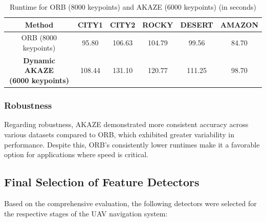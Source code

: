 \begin{table}[H]
    \centering
    \caption{Runtime for ORB (8000 keypoints) and AKAZE (6000 keypoints) (in seconds)}
    \label{tab:runtime_comparison_rot}
    \begin{tabular}{|c|c|c|c|c|c|}
    \hline
    \textbf{Method} & \textbf{CITY1} & \textbf{CITY2} & \textbf{ROCKY} & \textbf{DESERT} & \textbf{AMAZON} \\ \hline
    ORB (8000 keypoints) & 95.80 & 106.63 & 104.79 & 99.56 & 84.70 \\ \hline
    \makecell{\textbf{Dynamic AKAZE} \\ \textbf{(6000 keypoints)}} & 108.44 & 131.10 & 120.77 & 111.25 & 98.70 \\ \hline
    \end{tabular}
\end{table}

\subsubsection*{Robustness}

Regarding robustness, AKAZE demonstrated more consistent accuracy across various datasets compared to ORB, which exhibited greater variability in performance. Despite this, ORB's consistently lower runtimes make it a favorable option for applications where speed is critical.

\subsection{Final Selection of Feature Detectors}

Based on the comprehensive evaluation, the following detectors were selected for the respective stages of the UAV navigation system:

